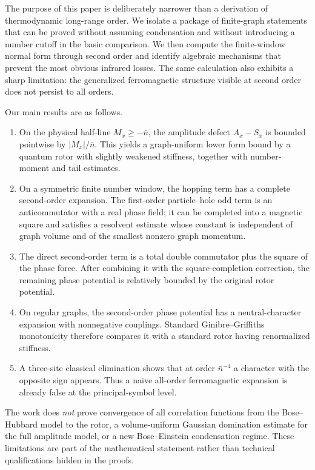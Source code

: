 \documentclass[11pt]{article}
\newcommand{\nbar}{\bar n}
\begin{document}
The purpose of this paper is deliberately narrower than a derivation of thermodynamic long-range order. We isolate a package of finite-graph statements that can be proved without assuming condensation and without introducing a number cutoff in the basic comparison. We then compute the finite-window normal form through second order and identify algebraic mechanisms that prevent the most obvious infrared losses. The same calculation also exhibits a sharp limitation: the generalized ferromagnetic structure visible at second order does not persist to all orders.

Our main results are as follows.
\begin{enumerate}
    \item On the physical half-line $M_x\ge -\nbar$, the amplitude defect $A_x-S_x$ is bounded pointwise by $|M_x|/\nbar$. This yields a graph-uniform lower form bound by a quantum rotor with slightly weakened stiffness, together with number-moment and tail estimates.
    \item On a symmetric finite number window, the hopping term has a complete second-order expansion. The first-order particle--hole odd term is an anticommutator with a real phase field; it can be completed into a magnetic square and satisfies a resolvent estimate whose constant is independent of graph volume and of the smallest nonzero graph momentum.
    \item The direct second-order term is a total double commutator plus the square of the phase force. After combining it with the square-completion correction, the remaining phase potential is relatively bounded by the original rotor potential.
    \item On regular graphs, the second-order phase potential has a neutral-character expansion with nonnegative couplings. Standard Ginibre--Griffiths monotonicity therefore compares it with a standard rotor having renormalized stiffness.
    \item A three-site classical elimination shows that at order $\nbar^{-4}$ a character with the opposite sign appears. Thus a naive all-order ferromagnetic expansion is already false at the principal-symbol level.
\end{enumerate}

The work does \emph{not} prove convergence of all correlation functions from the Bose--Hubbard model to the rotor, a volume-uniform Gaussian domination estimate for the full amplitude model, or a new Bose--Einstein condensation regime. These limitations are part of the mathematical statement rather than technical qualifications hidden in the proofs.
\end{document}

